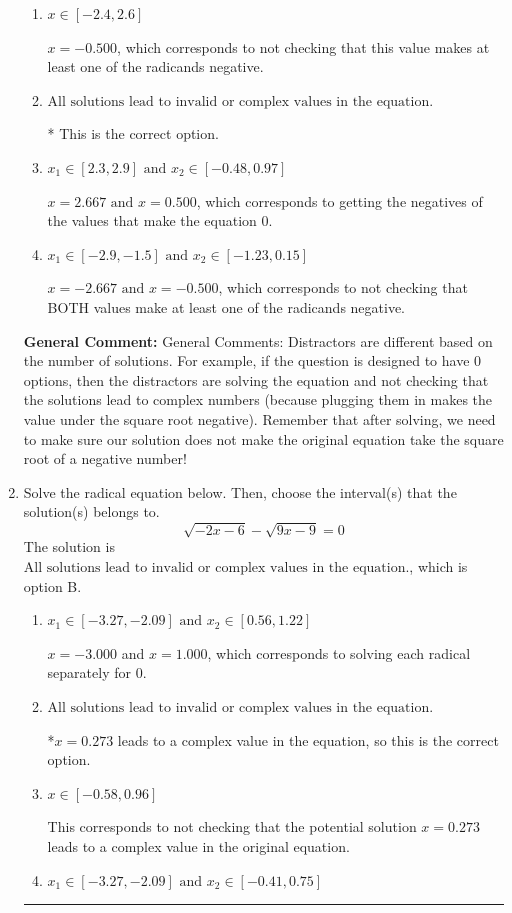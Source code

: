 \documentclass{extbook}[14pt]
\newcommand{\litem}[1]{\item #1

\rule{\textwidth}{0.4pt}}
\begin{document}
\begin{enumerate}
{\begin{enumerate}[label=\Alph*.]
$x = -2.667$, which corresponds to not checking that this value makes at least one of the radicands negative.
\item \( x \in [-2.4,2.6] \)

$x = -0.500$, which corresponds to not checking that this value makes at least one of the radicands negative.
\item \( \text{All solutions lead to invalid or complex values in the equation.} \)

* This is the correct option.
\item \( x_1 \in [2.3, 2.9] \text{ and } x_2 \in [-0.48,0.97] \)

$x = 2.667 \text{ and } x = 0.500$, which corresponds to getting the negatives of the values that make the equation 0.
\item \( x_1 \in [-2.9, -1.5] \text{ and } x_2 \in [-1.23,0.15] \)

$x = -2.667 \text{ and } x = -0.500$, which corresponds to not checking that BOTH values make at least one of the radicands negative.
\end{enumerate}

\textbf{General Comment:} General Comments: Distractors are different based on the number of solutions. For example, if the question is designed to have 0 options, then the distractors are solving the equation and not checking that the solutions lead to complex numbers (because plugging them in makes the value under the square root negative). Remember that after solving, we need to make sure our solution does not make the original equation take the square root of a negative number!
}
\litem{
Solve the radical equation below. Then, choose the interval(s) that the solution(s) belongs to.
\[ \sqrt{-2 x - 6} - \sqrt{9 x - 9} = 0 \]The solution is \( \text{All solutions lead to invalid or complex values in the equation.} \), which is option B.\begin{enumerate}[label=\Alph*.]
\item \( x_1 \in [-3.27, -2.09] \text{ and } x_2 \in [0.56,1.22] \)

$x = -3.000$ and $x = 1.000$, which corresponds to solving each radical separately for 0.
\item \( \text{All solutions lead to invalid or complex values in the equation.} \)

*$x = 0.273$ leads to a complex value in the equation, so this is the correct option.
\item \( x \in [-0.58,0.96] \)

This corresponds to not checking that the potential solution $x = 0.273$ leads to a complex value in the original equation.
\item \( x_1 \in [-3.27, -2.09] \text{ and } x_2 \in [-0.41,0.75] \)


\end{enumerate}}
\end{enumerate}
\end{document}

